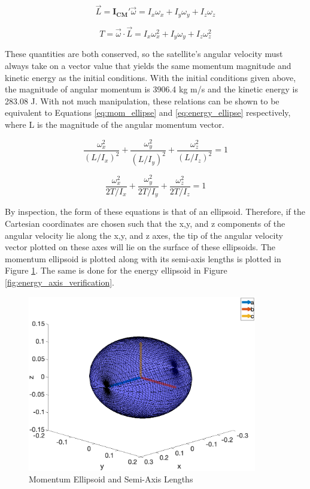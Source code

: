 \begin{equation} \label{eq:ang_mom}
    \vec{L} = \boldsymbol{I_{CM}'}\vec{\omega} = I_x \omega_x + I_y \omega_y + I_z \omega_z
\end{equation}

\begin{equation} \label{eq:rot_KE}
    T = \vec{\omega} \cdot \vec{L} = I_x \omega_x^2 + I_y \omega_y + I_z \omega_z^2
\end{equation}

These quantities are both conserved, so the satellite's angular velocity must always take on a vector value that yields the same momentum magnitude and kinetic energy as the initial conditions. With the initial conditions given above, the magnitude of angular momentum is 3906.4 kg m/s and the kinetic energy is 283.08 J. With not much manipulation, these relations can be shown to be equivalent to Equations \ref{eq:mom_ellipse} and \ref{eq:energy_ellipse} respectively, where L is the magnitude of the angular momentum vector.  

\begin{equation} \label{eq:mom_ellipse}
    \frac{\omega_x^2}{(L/I_x)^2} + \frac{\omega_y^2}{(L/I_y)^2} + \frac{\omega_z^2}{(L/I_z)^2} = 1
\end{equation}

\begin{equation} \label{eq:energy_ellipse}
    \frac{\omega_x^2}{2T/I_x} + \frac{\omega_y^2}{2T/I_y} + \frac{\omega_z^2}{2T/I_z} = 1
\end{equation}

By inspection, the form of these equations is that of an ellipsoid. Therefore, if the Cartesian coordinates are chosen such that the x,y, and z components of the angular velocity lie along the x,y, and z axes, the tip of the angular velocity vector plotted on these axes will lie on the surface of these ellipsoids. The momentum ellipsoid is plotted along with its semi-axis lengths is plotted in Figure \ref{fig:momentum_axis_verification}. The same is done for the energy ellipsoid in Figure \ref{fig:energy_axis_verification}.

\begin{figure}[H]
    \centering
    \includegraphics[width = 10cm]{Images/momentum_axes_random.png}
    \caption{Momentum Ellipsoid and Semi-Axis Lengths}
    \label{fig:momentum_axis_verification}
\end{figure}

